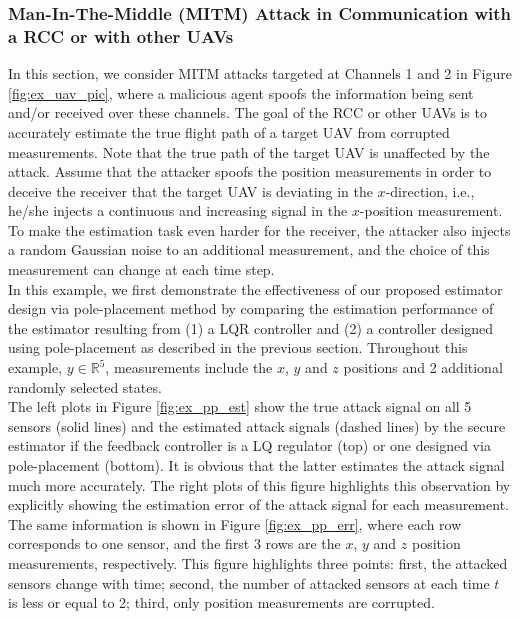 \documentclass[twocolumn]{autart}    %
\newcommand{\rev}[1]{{\normalsize{{{\color{blue}#1}}}}}
\begin{document}
\subsubsection{\rev{Man-In-The-Middle (MITM)} Attack in Communication with a RCC or with other UAVs} \label{sec:uav_utm}
\vspace{-0.4cm}
In this section, we consider MITM attacks targeted at Channels 1 and 2 in Figure \ref{fig:ex_uav_pic}, where a malicious agent spoofs the information being sent and/or received over these channels. The goal of the RCC or other UAVs is to accurately estimate the true flight path of a target UAV from corrupted measurements. 
Note that the true path of the target UAV is unaffected by the attack.
Assume that the attacker spoofs the position measurements in order to deceive the receiver that the target UAV is deviating in the $x$-direction, i.e., he/she injects a continuous and increasing signal in the $x$-position measurement.
To make the estimation task even harder for the receiver, the attacker also injects a random Gaussian noise to an additional measurement, and the choice of this measurement can change at each time step. 
\\
In this example, we first demonstrate the effectiveness of our proposed \rev{estimator} design via pole-placement method by comparing the estimation performance of the \rev{estimator} resulting from (1) a LQR controller and (2) a controller designed using pole-placement as described in the previous section.
Throughout this example, $y \in \mathbb{R}^5$, measurements include the $x$, $y$ and $z$ positions and 2 additional randomly selected states. 
\\
The left plots in Figure \ref{fig:ex_pp_est} show the true attack signal on all 5 sensors (solid lines) and the estimated attack signals (dashed lines) by the secure \rev{estimator} if the feedback controller is a LQ regulator (top) or one designed via pole-placement (bottom). It is obvious that the latter estimates the attack signal much more accurately. The right plots of this figure highlights this observation by explicitly showing the estimation error of the attack signal for each measurement.
\\
The same information is shown in Figure \ref{fig:ex_pp_err}, where each row corresponds to one sensor, and the first 3 rows are the $x$, $y$ and $z$ position measurements, respectively. This figure highlights three points: first, the attacked sensors change with time; second, the number of attacked sensors at each time $t$ is less or equal to 2; third, only position measurements are corrupted.
\end{document}
